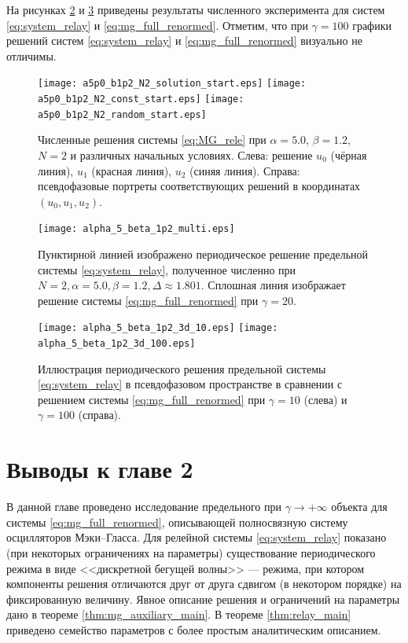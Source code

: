На рисунках \ref{fig:solution_2d} и \ref{fig:solution_3d} приведены результаты численного эксперимента для систем \eqref{eq:system_relay} и \eqref{eq:mg_full_renormed}. Отметим, что при $\gamma=100$ графики решений систем \eqref{eq:system_relay} и \eqref{eq:mg_full_renormed} визуально не отличимы.


\begin{figure}[!ht]
	\centering
	\texttt{[image: a5p0\_b1p2\_N2\_solution\_start.eps]}
	\texttt{[image: a5p0\_b1p2\_N2\_const\_start.eps]}
	\texttt{[image: a5p0\_b1p2\_N2\_random\_start.eps]}
	\caption{Численные решения системы \eqref{eq:MG_rele} при  $\alpha = 5.0$, $\beta = 1.2$, $N = 2$ и различных начальных условиях. Слева: решение $u_0$ (чёрная линия), $u_1$ (красная линия), $u_2$ (синяя линия). Справа: псевдофазовые портреты соответствующих решений в координатах $(u_0, u_1, u_2)$.}
	\label{fig:periodic_solution}
\end{figure}

\begin{figure}
	\centering
	\texttt{[image: alpha\_5\_beta\_1p2\_multi.eps]}
	\caption{Пунктирной линией изображено периодическое решение предельной системы  \eqref{eq:system_relay}, полученное численно при $N = 2, \alpha = 5.0, \beta = 1.2, \Delta \approx 1.801$. Сплошная линия изображает решение системы \eqref{eq:mg_full_renormed} при $\gamma = 20$.}
	\label{fig:solution_2d}
\end{figure}

\begin{figure}
	\centering
	\texttt{[image: alpha\_5\_beta\_1p2\_3d\_10.eps]}\hfill
	\texttt{[image: alpha\_5\_beta\_1p2\_3d\_100.eps]}
	\caption{Иллюстрация периодического решения предельной системы \eqref{eq:system_relay} в псевдофазовом пространстве в сравнении с решением системы \eqref{eq:mg_full_renormed} при $\gamma = 10$ (слева) и $\gamma = 100$ (справа).}
	\label{fig:solution_3d}
\end{figure}


\section{Выводы к главе 2}\label{sec:ch2/sect5}

В данной главе проведено исследование предельного при $\gamma \to +\infty$ объекта для системы \eqref{eq:mg_full_renormed}, описывающей полносвязную систему осцилляторов Мэки--Гласса. Для релейной системы \eqref{eq:system_relay} показано (при некоторых ограничениях на параметры) существование периодического режима в виде <<дискретной бегущей волны>> --- режима, при котором компоненты решения отличаются друг от друга сдвигом (в некотором порядке) на фиксированную величину. Явное описание решения и ограничений на параметры дано в теореме \ref{thm:mg_auxiliary_main}. В теореме \ref{thm:relay_main} приведено семейство параметров с более простым аналитическим описанием.

